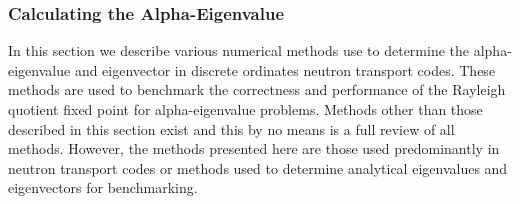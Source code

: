 \subsubsection{Calculating the Alpha-Eigenvalue}
\label{sec:CalcAlpha}

In this section we describe various numerical methods use to determine the alpha-eigenvalue and eigenvector in discrete ordinates neutron transport codes. These methods are used to benchmark the correctness and performance of the Rayleigh quotient fixed point for alpha-eigenvalue problems. Methods other than those described in this section exist and this by no means is a full review of all methods. However, the methods presented here are those used predominantly in neutron transport codes or methods used to determine analytical eigenvalues and eigenvectors for benchmarking.

